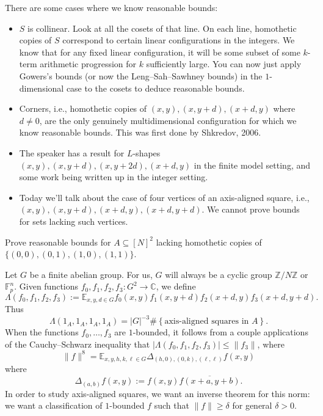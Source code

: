\documentclass[reqno]{amsart} 
\numberwithin{theorem}{section}
\numberwithin{equation}{section}
\begin{document}
There are some cases where we know reasonable bounds:
\begin{itemize}
\item $S$ is collinear.  Look at all the cosets of that line.  On each line, homothetic copies of $S$ correspond to certain linear configurations in the integers.  We know that for any fixed linear configuration, it will be some subset of some $k$-term arithmetic progression for $k$ sufficiently large.  You can now just apply Gowers's bounds (or now the Leng--Sah--Sawhney bounds) in the $1$-dimensional case to the cosets to deduce reasonable bounds.
\item Corners, i.e., homothetic copies of $(x, y),(x, y + d),(x + d, y)$ where $d \neq 0$, are the only genuinely multidimensional configuration for which we know reasonable bounds.  This was first done by Shkredov, 2006.
\item The speaker has a result for $L$-shapes $(x, y),(x, y + d),(x, y + 2 d), (x + d, y)$ in the finite model setting, and some work being written up in the integer setting.
\item Today we'll talk about the case of four vertices of an axis-aligned square, i.e., $(x, y),(x, y + d), (x + d, y), (x + d, y + d)$.  We cannot prove bounds for sets lacking such vertices.
\end{itemize}
\begin{problem}
  Prove reasonable bounds for $A \subseteq[N]^2$ lacking homothetic copies of $\{(0, 0), (0, 1), (1, 0),(1, 1)\}$.
\end{problem}
Let $G$ be a finite abelian group.  For us, $G$ will always be a cyclic group $\mathbb{Z} / N \mathbb{Z}$ or $\mathbb{F}_p^n$.  Given functions $f_0, f_1, f_2, f_3 : G^2 \rightarrow \mathbb{C}$, we define
\begin{equation*}
  \Lambda(f_0, f_1, f_2, f_3) := \mathbb{E}_{x, y, d \in G}
  f_0(x, y)
  f_1(x, y + d)
  f_2(x + d, y)
  f_3(x + d, y + d).
\end{equation*}
Thus
\begin{equation*}
  \Lambda(1_A,1_A,1_A,1_A) = \lvert G \rvert^{- 3} \# \left\{ \text{axis-aligned squares in } A \right\}.
\end{equation*}
When the functions $f_0, \dotsc, f_3$ are $1$-bounded, it follows from a couple applications of the Cauchy--Schwarz inequality that $\left\lvert \Lambda(f_0, f_1, f_2, f_3) \right\rvert \leq \lVert f_3 \rVert$, where
\begin{equation*}
  \lVert f \rVert^8 =
  \mathbb{E}_{x, y, h, k, \ell \in G}
  \Delta_{(h, 0),(0, k), (\ell, \ell)} f(x, y)
\end{equation*}
where
\begin{equation*}
  \Delta_{(a, b)} f(x, y) := f(x, y) \overline{f(x + a, y + b)}.
\end{equation*}
In order to study axis-aligned squares, we want an inverse theorem for this norm: we want a classification of $1$-bounded $f$ such that $\lVert f \rVert \geq \delta$ for general $\delta > 0$.
\end{document}
